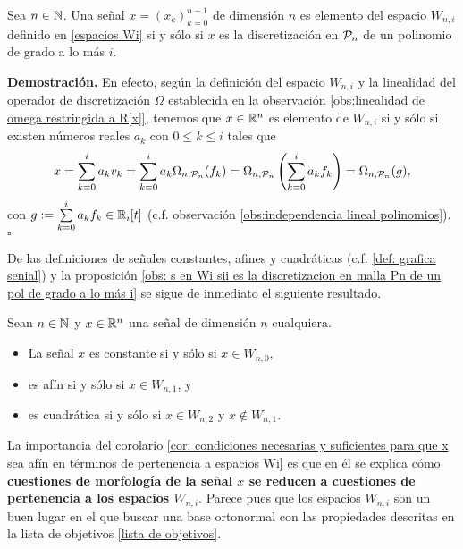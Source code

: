 \begin{prop} \label{obs: s en Wi sii es la discretizacion en malla Pn de un pol de grado a lo más i}
Sea $n \in \mathbb{N}$.
Una señal $x=(x_{k})_{k=0}^{n-1}$ de dimensión $n$
es elemento del espacio $W_{n,i}$ 
definido en \eqref{espacios Wi}
si y sólo si 
$x$ es la discretización en $\mathcal{P}_{n}$
de un polinomio de grado a lo más $i$.
\end{prop}
\noindent
\textbf{Demostración.}
En efecto, según la definición del espacio
$W_{n,i}$ y la linealidad del operador
de discretización 
$\Omega$ establecida en 
la observación
\ref{obs:linealidad de omega restringida a R[x]}, 
tenemos que $x \in \mathbb{R}^{n}$ es elemento de 
$W_{n,i}$ si y sólo si existen números reales
$a_{k}$ con $0 \leq k \leq i$ tales que
\begin{align*}
x=  \sum\limits_{k=0}^{i}a_{k}v_{k} 
=  \sum\limits_{k=0}^{i}a_{k}\Omega_{n, \mathcal{P}_{n}}(f_{k})
=  \Omega_{n, \mathcal{P}_{n}} \left( 
\sum\limits_{k=0}^{i}a_{k}f_{k} \right)
=  \Omega_{n, \mathcal{P}_{n}} (g),
\end{align*}
con $g := \sum\limits_{k=0}^{i}a_{k}f_{k} \in \mathbb{R}_{i}[t]$
(c.f. observación 
\ref{obs:independencia lineal polinomios}).
\null\nobreak\hfill\ensuremath{\square} %


De las definiciones de señales constantes, afines
y cuadráticas (c.f. \ref{def: grafica senial})
y la proposición 
\ref{obs: s en Wi sii es la discretizacion en malla Pn de un pol de grado a lo más i}
se sigue de inmediato el siguiente resultado.
\begin{cor} \label{cor: condiciones necesarias y suficientes para que x sea afín en términos de pertenencia a espacios Wi}
Sean $n \in \mathbb{N}$ y $x \in \mathbb{R}^{n}$ una señal de dimensión
$n$ cualquiera.
\begin{itemize}
\item La señal $x$ es constante si y sólo si $x \in W_{n,0}$,

\item es afín si y sólo si $x \in W_{n,1}$, y 

\item es cuadrática si y sólo si $x \in W_{n,2}$
y $x \not\in W_{n,1}$.
\end{itemize}
\end{cor}
\noindent
La importancia del corolario
\ref{cor: condiciones necesarias y suficientes para que x sea afín en términos de pertenencia a espacios Wi}
es que en él se explica cómo
\textbf{cuestiones de morfología de la señal $x$
se reducen a cuestiones de pertenencia a los espacios $W_{n,i}$}.
Parece pues que los espacios $W_{n,i}$ son un buen lugar
en el que buscar una base ortonormal con las propiedades
descritas en la lista 
de objetivos \ref{lista de objetivos}.

